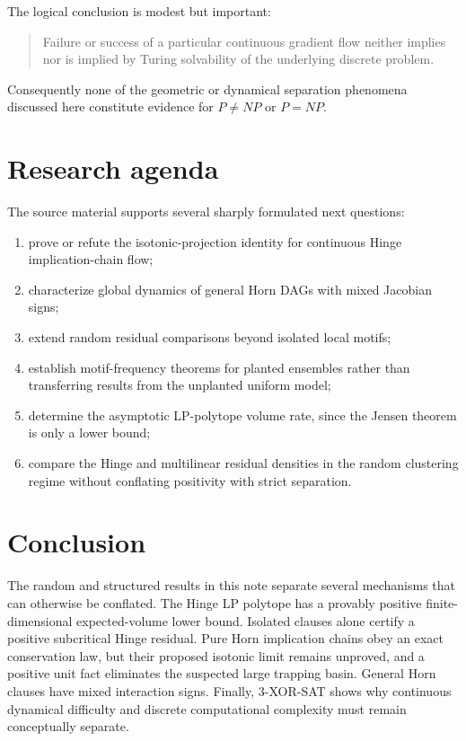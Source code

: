 \documentclass[11pt,a4paper]{article}
\begin{document}
The logical conclusion is modest but important:
\begin{quote}
Failure or success of a particular continuous gradient flow neither implies nor is implied by Turing solvability of the underlying discrete problem.
\end{quote}
Consequently none of the geometric or dynamical separation phenomena discussed here constitute evidence for $P\ne NP$ or $P=NP$.

\section{Research agenda}
The source material supports several sharply formulated next questions:
\begin{enumerate}
\item prove or refute the isotonic-projection identity for continuous Hinge implication-chain flow;
\item characterize global dynamics of general Horn DAGs with mixed Jacobian signs;
\item extend random residual comparisons beyond isolated local motifs;
\item establish motif-frequency theorems for planted ensembles rather than transferring results from the unplanted uniform model;
\item determine the asymptotic LP-polytope volume rate, since the Jensen theorem is only a lower bound;
\item compare the Hinge and multilinear residual densities in the random clustering regime without conflating positivity with strict separation.
\end{enumerate}

\section{Conclusion}
The random and structured results in this note separate several mechanisms that can otherwise be conflated. The Hinge LP polytope has a provably positive finite-dimensional expected-volume lower bound. Isolated clauses alone certify a positive subcritical Hinge residual. Pure Horn implication chains obey an exact conservation law, but their proposed isotonic limit remains unproved, and a positive unit fact eliminates the suspected large trapping basin. General Horn clauses have mixed interaction signs. Finally, 3-XOR-SAT shows why continuous dynamical difficulty and discrete computational complexity must remain conceptually separate.
\end{document}
